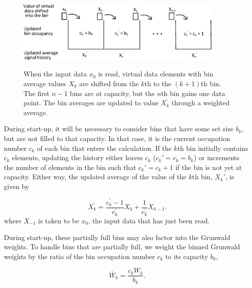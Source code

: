 \begin{figure}
\includegraphics[width=4in]{binShifting.eps}
\label{fig:binShifting}
\caption{When the input data $x_0$ is read, virtual data elements with bin average values $X_k$ are shifted from the $k$th to the $(k+1)$th bin. The first $n-1$ bins are at capacity, but the $n$th bin gains one data point. The bin averages are updated to value $X_k^\prime$ through a weighted average.}
\end{figure}

During start-up, it will be necessary to consider bins that have some
set size $b_k$, but are not filled to that capacity. In that case, it
is the current occupation number $c_k$ of each bin that enters the
calculation. If the $k$th bin initially contains $c_k$ elements,
updating the history either leaves $c_k$ ($c_k\prime=c_k=b_k$) or
increments the number of elements in the bin such that $c_k\prime =
c_k + 1$ if the bin is not yet at capacity. Either way, the updated
average of the value of the $k$th bin, $X_k\prime$, is given by

\begin{equation}
X_k^\prime = \frac{c_k^\prime-1}{c_k^\prime}X_k + \frac{1}{c_k^\prime}X_{k-1}.
\label{eqn:updating}
\end{equation}
where $X_{-1}$ is taken to be $x_0$, the input data that has just been
read. 

During start-up, these partially full bins may also factor into
the Grunwald weights. To handle bins that are partially full, we
weight the binned Grunwald weights by the ratio of the bin occupation
number $c_k$ to its capacity $b_k$,

\begin{equation}
\bar{W}_k= \frac{c_k W_k}{b_k}.
\label{eqn:Wbar}
\end{equation} 










